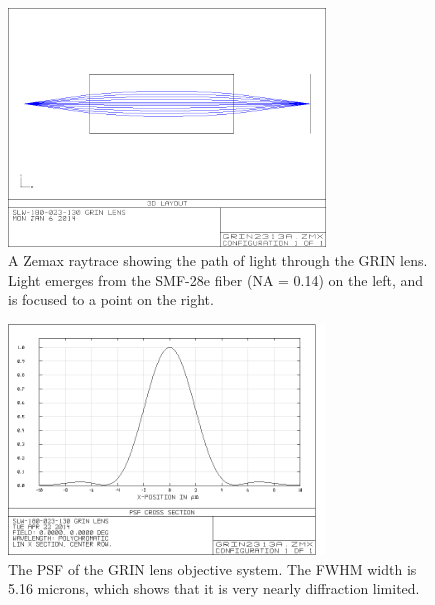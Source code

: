 \begin{figure}[h!]
\centering
\includegraphics[width=0.75\textwidth]{Images/Zemax/GRO-raytrace.png}
\caption[A Zemax raytrace showing the path of light through the GRIN lens.]{A Zemax raytrace showing the path of light through the GRIN lens. Light emerges from the SMF-28e fiber (NA = 0.14) on the left, and is focused to a point on the right.}
\end{figure}

\begin{figure}[h!]
\centering
\includegraphics[width=0.75\textwidth]{Images/Zemax/grin_psf_2.png}
\caption[The PSF of the GRIN lens objective system.]{The PSF of the GRIN lens objective system. The FWHM width is 5.16 microns, which shows that it is very nearly diffraction limited.}
\end{figure}

